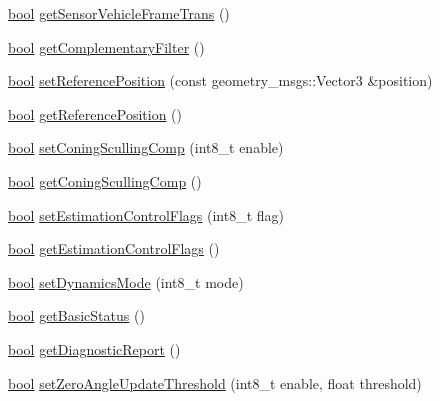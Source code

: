 \begin{DoxyCompactItemize}
\item 
\hyperlink{classbool}{bool} \hyperlink{classmicrostrain__mips__client_1_1ClMicrostainMips_aacdca79f2e8ed62122552e8196c0c643}{get\+Sensor\+Vehicle\+Frame\+Trans} ()
\item 
\hyperlink{classbool}{bool} \hyperlink{classmicrostrain__mips__client_1_1ClMicrostainMips_afe0f9a7fe9301e0932a7d8786c905ffb}{get\+Complementary\+Filter} ()
\item 
\hyperlink{classbool}{bool} \hyperlink{classmicrostrain__mips__client_1_1ClMicrostainMips_a98d008f7c8abc7a7672392cff9551e06}{set\+Reference\+Position} (const geometry\+\_\+msgs\+::\+Vector3 \&position)
\item 
\hyperlink{classbool}{bool} \hyperlink{classmicrostrain__mips__client_1_1ClMicrostainMips_a34ae5d2450f693e5e8c8e58786118a05}{get\+Reference\+Position} ()
\item 
\hyperlink{classbool}{bool} \hyperlink{classmicrostrain__mips__client_1_1ClMicrostainMips_ae6962e87b75899d30b35eb8943bae8bc}{set\+Coning\+Sculling\+Comp} (int8\+\_\+t enable)
\item 
\hyperlink{classbool}{bool} \hyperlink{classmicrostrain__mips__client_1_1ClMicrostainMips_ae2c3a98a2f3a2fcc92fe750d885370f4}{get\+Coning\+Sculling\+Comp} ()
\item 
\hyperlink{classbool}{bool} \hyperlink{classmicrostrain__mips__client_1_1ClMicrostainMips_a1ed2fa01f7363d9524a8436dfcd93dc4}{set\+Estimation\+Control\+Flags} (int8\+\_\+t flag)
\item 
\hyperlink{classbool}{bool} \hyperlink{classmicrostrain__mips__client_1_1ClMicrostainMips_a93bbaedd7885cc976b9da4db81a272a6}{get\+Estimation\+Control\+Flags} ()
\item 
\hyperlink{classbool}{bool} \hyperlink{classmicrostrain__mips__client_1_1ClMicrostainMips_ace3d69bf8ea5e71b6928fae2c8736bd2}{set\+Dynamics\+Mode} (int8\+\_\+t mode)
\item 
\hyperlink{classbool}{bool} \hyperlink{classmicrostrain__mips__client_1_1ClMicrostainMips_ad0253fe97de1c6be89f37b63e0f34428}{get\+Basic\+Status} ()
\item 
\hyperlink{classbool}{bool} \hyperlink{classmicrostrain__mips__client_1_1ClMicrostainMips_aeb81e7280f96ce01a0ea0d0108a177b7}{get\+Diagnostic\+Report} ()
\item 
\hyperlink{classbool}{bool} \hyperlink{classmicrostrain__mips__client_1_1ClMicrostainMips_a670182955f928c633ac0038c315b0bf5}{set\+Zero\+Angle\+Update\+Threshold} (int8\+\_\+t enable, float threshold)
\item 

\end{DoxyCompactItemize}
